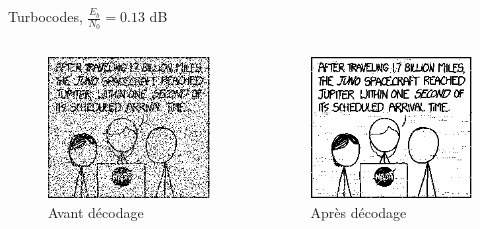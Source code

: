 \documentclass[11pt]{beamer}
\begin{document}
\begin{frame}{Turbocodes, $\frac{E_b}{N_0} = 0.13$ dB}
	\begin{columns}
		\begin{column}{.5\textwidth}
			\begin{figure}
				\includegraphics[scale=0.6]{turbo_noisy_97}\\
				Avant d\'ecodage
			\end{figure}
		\end{column}
		\begin{column}{.5\textwidth}
			\begin{figure}
				\includegraphics[scale=0.6]{turbo_decoded_97}\\
				Apr\`es d\'ecodage
			\end{figure}
		\end{column}
	\end{columns}
\end{frame}
\end{document}
